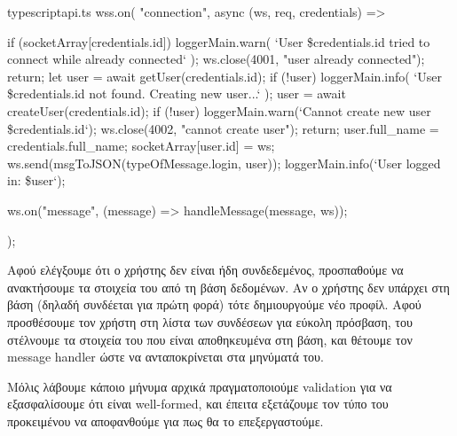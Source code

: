 \documentclass[../thesis.tex]{subfiles}
\begin{document}
\begin{codeblock}{typescript}{api.ts}
  wss.on(
    "connection",
    async (ws, req, credentials) => {
      if (socketArray[credentials.id]) {
        loggerMain.warn(
          `User \${credentials.id} tried to connect while already connected`
        );
        ws.close(4001, "user already connected");
        return;
      }
      let user = await getUser(credentials.id);
      if (!user) {
        loggerMain.info(
          `User \${credentials.id} not found. Creating new user...`
        );
        user = await createUser(credentials.id);
        if (!user) {
          loggerMain.warn(`Cannot create new user \${credentials.id}`);
          ws.close(4002, "cannot create user");
          return;
        }
      }
      user.full_name = credentials.full_name;
      socketArray[user.id] = ws;
      ws.send(msgToJSON(typeOfMessage.login, user));
      loggerMain.info(`User logged in: \${user}`);

      ws.on("message", (message) => handleMessage(message, ws));
    }
  );
\end{codeblock}

Αφού ελέγξουμε ότι ο χρήστης δεν είναι ήδη συνδεδεμένος, προσπαθούμε να ανακτήσουμε τα στοιχεία του από τη βάση δεδομένων.
Αν ο χρήστης δεν υπάρχει στη βάση (δηλαδή συνδέεται για πρώτη φορά) τότε δημιουργούμε νέο προφίλ.
Αφού προσθέσουμε τον χρήστη στη λίστα των συνδέσεων για εύκολη πρόσβαση, του στέλνουμε τα στοιχεία του που είναι αποθηκευμένα στη βάση, και θέτουμε τον message handler ώστε να ανταποκρίνεται στα μηνύματά του.

Μόλις λάβουμε κάποιο μήνυμα αρχικά πραγματοποιούμε validation για να εξασφαλίσουμε ότι είναι well-formed, και έπειτα εξετάζουμε τον τύπο του προκειμένου να αποφανθούμε για πως θα το επεξεργαστούμε.
\end{document}
